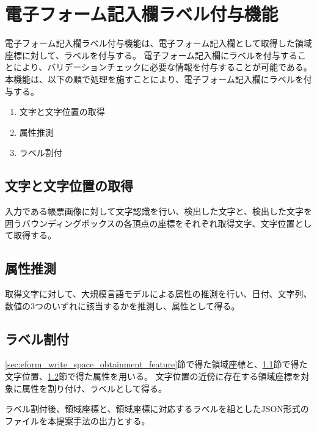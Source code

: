 \section{電子フォーム記入欄ラベル付与機能}\label{sec:label_link}
電子フォーム記入欄ラベル付与機能は、電子フォーム記入欄として取得した領域座標に対して、ラベルを付与する。
電子フォーム記入欄にラベルを付与することにより、バリデーションチェックに必要な情報を付与することが可能である。
本機能は、以下の順で処理を施すことにより、電子フォーム記入欄にラベルを付与する。

\begin{enumerate}
  \item 文字と文字位置の取得
  \item 属性推測
  \item ラベル割付
\end{enumerate}

\subsection{文字と文字位置の取得}\label{subsec:char_and_bbox_obtainment}
入力である帳票画像に対して文字認識を行い、検出した文字と、検出した文字を囲うバウンディングボックスの各頂点の座標をそれぞれ取得文字、文字位置として取得する。

\subsection{属性推測}\label{subsec:att_prediction}
取得文字に対して、大規模言語モデルによる属性の推測を行い、日付、文字列、数値の3つのいずれに該当するかを推測し、属性として得る。

\subsection{ラベル割付}\label{subsec:label_link}
\ref{sec:eform_write_space_obtainment_feature}節で得た領域座標と、\ref{subsec:char_and_bbox_obtainment}節で得た文字位置、\ref{subsec:att_prediction}節で得た属性を用いる。
文字位置の近傍に存在する領域座標を対象に属性を割り付け、ラベルとして得る。

ラベル割付後、領域座標と、領域座標に対応するラベルを組としたJSON形式のファイルを本提案手法の出力とする。
